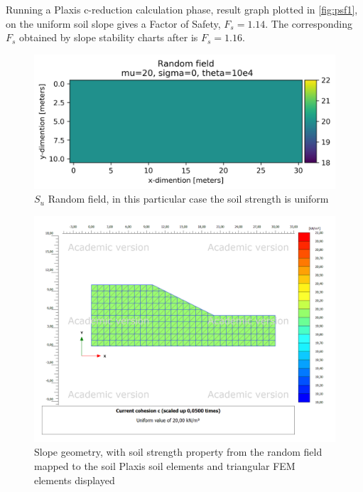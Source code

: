 Running a Plaxis c-reduction calculation phase, result graph plotted in \ref{fig:psf1}, on the uniform soil slope gives a Factor of Safety, $F_s = 1.14$. The corresponding $F_s$ obtained by slope stability charts after \citet{Janbu1968slope} is $F_s = 1.16$. 

\begin{figure}[h]
	\includegraphics[width=\textwidth]{fig/testRF}
	\caption{$S_u$ Random field, in this particular case the soil strength is uniform}
	\label{fig:p1}
\end{figure}

\begin{figure}[h]
	\includegraphics[width=\textwidth]{fig/testp}
	\caption{Slope geometry, with soil strength property from the random field mapped to the soil Plaxis soil elements and triangular FEM elements displayed}
	\label{fig:p2}
\end{figure}

